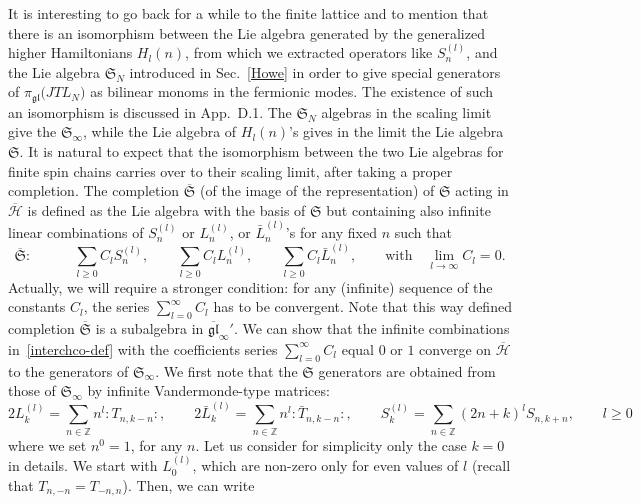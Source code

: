 \documentclass[11pt]{article}
\newcommand{\strt}{T}
\newcommand{\bstrt}{\bar{\strt}}
\newcommand{\JTL}[1]{JTL_{#1}}
\newcommand{\Hilb}{\mathcal{H}}
\newcommand{\cHilb}{\overline{\Hilb}}
\newcommand{\oZ}{\mathbb{Z}}
\newcommand{\interLie}{\mathfrak{S}}
\newcommand{\interch}{\interLie}
\newcommand{\interchco}{\overline{\interLie}}
\newcommand{\interfin}[1]{\interLie_{#1}}
\newcommand{\bglinf}{\overline{\gl}_{\infty}}
\newcommand{\interinfin}{\interLie_{\infty}}
\newcommand{\gl}{\mathfrak{gl}}
\newcommand{\repgl}{\pi_{\gl}}
\newcommand{\enrg}{S}
\newcommand{\AppHln}{D}
\newcommand{\nord}[1]{\boldsymbol{\colon}\!\!{#1}\boldsymbol{\colon}\!\!}
\theoremstyle{definition}
\begin{document}
 It is interesting to go back for a while to the finite lattice and to mention that there is
an isomorphism between the Lie algebra generated by the generalized higher Hamiltonians $H_l(n)$, from which we extracted operators like $\enrg^{(l)}_n$, and the Lie algebra $\interfin{N}$ introduced in  Sec.~\ref{Howe} in order to give  special  generators of $\repgl\bigl(\JTL{N}\bigr)$ as bilinear monoms in the fermionic modes.
The existence of such an isomorphism is discussed  in App.~\AppHln.1.
The $\interfin{N}$ algebras in the scaling limit give the $\interinfin$, while
 the Lie algebra of $H_l(n)$'s gives in the  limit the Lie algebra $\interch$.
It is natural to  expect that the isomorphism between the two Lie algebras for finite spin chains carries over to their scaling limit, after taking a proper completion.
The completion $\interchco$ (of the image of the representation) of $\interch$ acting in $\cHilb$ is defined as the Lie algebra with the basis of $\interch$ but containing also  infinite linear combinations of $\enrg^{(l)}_n$ or $L_n^{(l)}$, or $\bar{L}_n^{(l)}$'s for any fixed $n$ such that
\begin{equation}\label{interchco-def}
\interchco:\qquad\quad \sum_{l\geq 0} C_l \enrg^{(l)}_n,\qquad \sum_{l\geq 0} C_l L^{(l)}_n,\qquad \sum_{l\geq 0} C_l \bar{L}^{(l)}_n,\qquad \text{with}
\quad \lim_{l\to\infty}C_l=0.
\end{equation}
Actually, we will require a stronger condition: for any (infinite) sequence of the constants $C_l$, the series $\sum_{l=0}^{\infty}C_l$ has to be convergent. Note that this way defined completion $\interchco$ is a subalgebra in $\bglinf'$.
We can show that the infinite combinations in~\eqref{interchco-def}
with the coefficients series $\sum_{l=0}^{\infty}C_l$ equal $0$ or $1$ converge on $\cHilb$ to the generators of $\interinfin$.
We first note that the $\interch$ generators are obtained from those of $\interinfin$ by infinite Vandermonde-type matrices:
\begin{equation}\label{interch-gen}
2L_k^{(l)} = \sum_{n\in\oZ}n^l \nord{\strt_{n,k-n}},\qquad
2\bar{L}_k^{(l)} = \sum_{n\in\oZ}n^l \nord{\bstrt_{n,k-n}},\qquad
\enrg^{(l)}_k = \sum_{n\in\oZ}(2n+k)^l \enrg_{n,k+n},\qquad l\geq0
\end{equation}
where we set $n^0=1$, for any $n$.   Let us consider for simplicity only the case $k=0$ in details. We start with $L_0^{(l)}$, which are non-zero only for even values of $l$ (recall that $\strt_{n,-n}=\strt_{-n,n}$). Then, we can write
\end{document}
